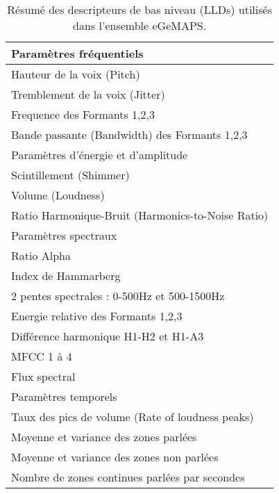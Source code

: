 \begin{table}[h]
   \centering
   \begin{tabular}{| l |}
   \hline
       Paramètres fréquentiels \\
   \hline
       Hauteur de la voix (Pitch)  \\
       Tremblement de la voix (Jitter) \\
       Frequence des Formants 1,2,3 \\
       Bande passante (Bandwidth) des Formants 1,2,3 \\
   \hline
       Paramètres d'énergie et d'amplitude \\
   \hline
       Scintillement (Shimmer) \\
       Volume (Loudness) \\
       Ratio Harmonique-Bruit (Harmonics-to-Noise Ratio) \\
   \hline
       Paramètres spectraux \\
   \hline
       Ratio Alpha \\
       Index de Hammarberg \\
       2 pentes spectrales : 0-500Hz et 500-1500Hz \\
       Energie relative des Formants 1,2,3 \\
       Différence harmonique H1-H2 et H1-A3 \\
       MFCC 1 à 4 \\
       Flux spectral \\
   \hline
       Paramètres temporels  \\
   \hline
       Taux des pics de volume (Rate of loudness peaks) \\
       Moyenne et variance des zones parlées \\
       Moyenne et variance des zones non parlées \\
       Nombre de zones continues parlées par secondes \\
   \hline

   \end{tabular}
   \caption{Résumé des descripteurs de bas niveau (LLDs) utilisés dans l'ensemble eGeMAPS.}
   \label{tab:egemaps}
\end{table}
